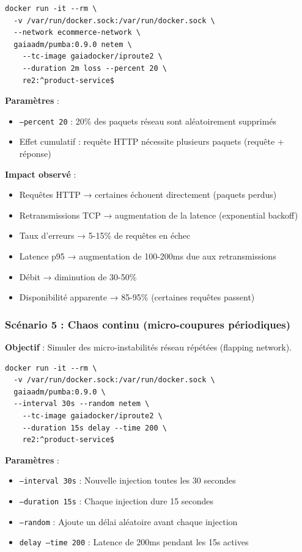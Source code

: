 \begin{lstlisting}[caption={Commande Pumba - Perte 20\% de paquets}]
docker run -it --rm \
  -v /var/run/docker.sock:/var/run/docker.sock \
  --network ecommerce-network \
  gaiaadm/pumba:0.9.0 netem \
    --tc-image gaiadocker/iproute2 \
    --duration 2m loss --percent 20 \
    re2:^product-service$
\end{lstlisting}

\textbf{Paramètres} :
\begin{itemize}
    \item \texttt{--percent 20} : 20\% des paquets réseau sont aléatoirement supprimés
    \item Effet cumulatif : requête HTTP nécessite plusieurs paquets (requête + réponse)
\end{itemize}

\textbf{Impact observé} :
\begin{itemize}
    \item Requêtes HTTP → certaines échouent directement (paquets perdus)
    \item Retransmissions TCP → augmentation de la latence (exponential backoff)
    \item Taux d'erreurs → 5-15\% de requêtes en échec
    \item Latence p95 → augmentation de 100-200ms due aux retransmissions
    \item Débit → diminution de 30-50\%
    \item Disponibilité apparente → 85-95\% (certaines requêtes passent)
\end{itemize}

\subsubsection{Scénario 5 : Chaos continu (micro-coupures périodiques)}

\textbf{Objectif} : Simuler des micro-instabilités réseau répétées (flapping network).

\begin{lstlisting}[caption={Commande Pumba - Cycles de latence 15s toutes les 30s}]
docker run -it --rm \
  -v /var/run/docker.sock:/var/run/docker.sock \
  gaiaadm/pumba:0.9.0 \
  --interval 30s --random netem \
    --tc-image gaiadocker/iproute2 \
    --duration 15s delay --time 200 \
    re2:^product-service$
\end{lstlisting}

\textbf{Paramètres} :
\begin{itemize}
    \item \texttt{--interval 30s} : Nouvelle injection toutes les 30 secondes
    \item \texttt{--duration 15s} : Chaque injection dure 15 secondes
    \item \texttt{--random} : Ajoute un délai aléatoire avant chaque injection
    \item \texttt{delay --time 200} : Latence de 200ms pendant les 15s actives
\end{itemize}

